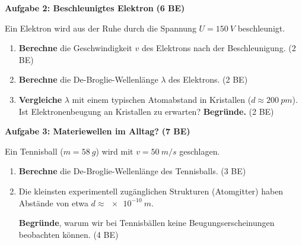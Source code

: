 \documentclass[11pt,a4paper]{article}
\begin{document}

\textbf{Aufgabe 2: Beschleunigtes Elektron} \hfill \textbf{(6 BE)}

Ein Elektron wird aus der Ruhe durch die Spannung $U = \SI{150}{V}$ beschleunigt.

\begin{enumerate}[label=\alph*), leftmargin=*, nosep]
\item \textbf{Berechne} die Geschwindigkeit $v$ des Elektrons nach der Beschleunigung. \hfill (2 BE)

\vspace{3cm}

\item \textbf{Berechne} die De-Broglie-Wellenlänge $\lambda$ des Elektrons. \hfill (2 BE)

\vspace{3cm}

\item \textbf{Vergleiche} $\lambda$ mit einem typischen Atomabstand in Kristallen ($d \approx \SI{200}{pm}$). Ist Elektronenbeugung an Kristallen zu erwarten? \textbf{Begründe.} \hfill (2 BE)

\vspace{2.5cm}

\end{enumerate}


\textbf{Aufgabe 3: Materiewellen im Alltag?} \hfill \textbf{(7 BE)}

Ein Tennisball ($m = \SI{58}{g}$) wird mit $v = \SI{50}{m/s}$ geschlagen.

\begin{enumerate}[label=\alph*), leftmargin=*, nosep]
\item \textbf{Berechne} die De-Broglie-Wellenlänge des Tennisballs. \hfill (3 BE)

\vspace{3.5cm}

\item Die kleinsten experimentell zugänglichen Strukturen (Atomgitter) haben Abstände von etwa $d \approx \SI{e-10}{m}$.

\textbf{Begründe}, warum wir bei Tennisbällen keine Beugungserscheinungen beobachten können. \hfill (4 BE)

\vspace{3cm}

\end{enumerate}
\end{document}
